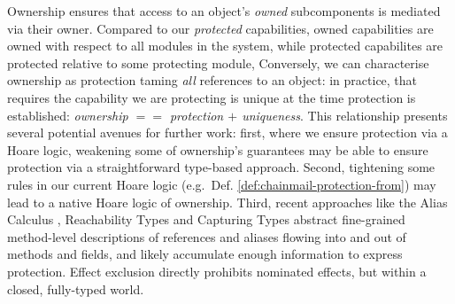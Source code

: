Ownership ensures that access to an object's \textit{owned} 
subcomponents is mediated via their owner.
Compared to our \textit{protected} capabilities,
owned capabilities are owned with respect to all
modules in the system, 
while protected capabilites are protected relative to some
protecting module,
Conversely, we can characterise ownership as
protection taming \textit{all} references to an object: in practice,
that requires the capability we are protecting is unique at the time
protection is established: \textit{ownership $==$ protection $+$
  uniqueness}.  This relationship presents several potential avenues
for further work: first, where we ensure protection via
a Hoare logic,
weakening some 
of ownership's guarantees may be able to ensure protection via a
straightforward type-based approach.
Second,  tightening some
rules in our current Hoare logic (e.g.\ Def. \ref{def:chainmail-protection-from})
may lead to a native  Hoare logic of ownership.
Third, recent approaches like
%
%
the Alias
Calculus \cite{meyer-alias-calculus-scp2015,meyer-auto-alias-sncs2020},
Reachability
Types \cite{romf-reachability-types-oopsla2021,rompf-poly-reachability-oopsla2024}
and Capturing
Types \cite{odersky-capturing-types-toplas2023,scoped-effects-oopsla2022,odersky-reach-prog2024}
abstract fine-grained method-level descriptions of 
references and aliases flowing into and out of methods and fields,
and likely accumulate enough information to express 
protection. Effect exclusion
\cite{fx-exclusion-icfp2023} directly prohibits nominated
effects, but within a closed, fully-typed world.




